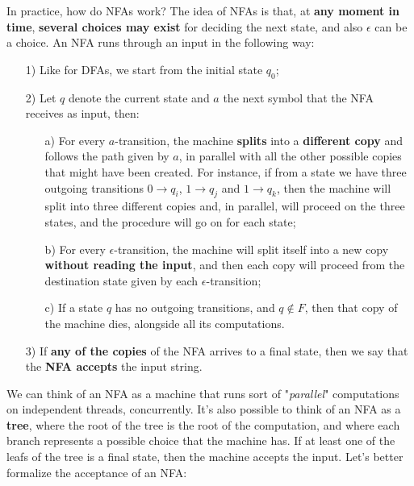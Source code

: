 In practice, how do NFAs work? The idea of NFAs is that, at \textbf{any moment in time}, \textbf{several choices may exist} for deciding the next state, and also $\epsilon$ can be a choice. An NFA runs through an input in the following way:
\begin{itemize}
    \item [1)] Like for DFAs, we start from the initial state $q_0$;
    \item [2)] Let $q$ denote the current state and $a$ the next symbol that the NFA receives as input, then:
    \begin{itemize}
        \item [a)] For every $a$-transition, the machine \textbf{splits} into a \textbf{different copy} and follows the path given by $a$, in parallel with all the other possible copies that might have been created. For instance, if from a state we have three outgoing transitions $0 \rightarrow q_i$, $1 \rightarrow q_j$ and $1 \rightarrow q_k$, then the machine will split into three different copies and, in parallel, will proceed on the three states, and the procedure will go on for each state;
        \item [b)] For every $\epsilon$-transition, the machine will split itself into a new copy \textbf{without reading the input}, and then each copy will proceed from the destination state given by each $\epsilon$-transition;
        \item [c)] If a state $q$ has no outgoing transitions, and $q \notin F$, then that copy of the machine dies, alongside all its computations.
    \end{itemize}
    \item [3)] If \textbf{any of the copies} of the NFA arrives to a final state, then we say that the \textbf{NFA accepts} the input string.
\end{itemize}

We can think of an NFA as a machine that runs sort of "\textit{parallel}" computations on independent threads, concurrently. It's also possible to think of an NFA as a \textbf{tree}, where the root of the tree is the root of the computation, and where each branch represents a possible choice that the machine has. If at least one of the leafs of the tree is a final state, then the machine accepts the input. Let's better formalize the acceptance of an NFA:

